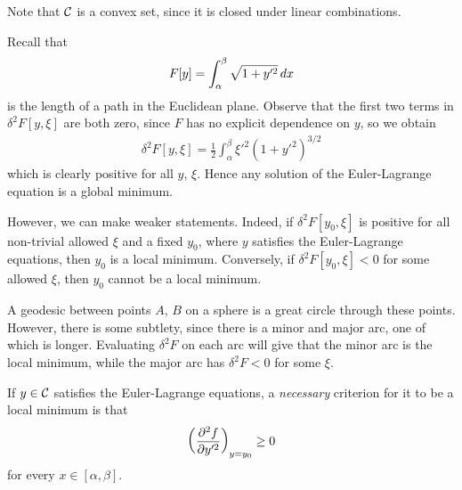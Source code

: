 \documentclass{../template/note}
\begin{document}
    \begin{remark*}
        Note that $\mathcal{C}$ is a convex set, since it is closed under linear combinations.
    \end{remark*}
    
    \begin{example*}
        Recall that
        \begin{align*}
            F[y] = \int_\alpha^\beta \sqrt{1 + y'^2} \,d{x}
        \end{align*}
        is the length of a path in the Euclidean plane. Observe that the first two terms in $\delta^2 F[y, \xi]$ are both zero, since $F$ has no explicit dependence on $y$, so we obtain
        \begin{align*}
            \delta^2 F[y, \xi] = \frac 1 2 \int_\alpha^\beta \xi'^2 \left(1 + y'^2\right)^{3/2}
        \end{align*}
        which is clearly positive for all $y$, $\xi$. Hence any solution of the Euler-Lagrange equation is a global minimum.
    \end{example*}
    
    However, we can make weaker statements. Indeed, if $\delta^2 F[y_0, \xi]$ is positive for all non-trivial allowed $\xi$ and a fixed $y_0$, where $y$ satisfies the Euler-Lagrange equations, then $y_0$ is a local minimum. Conversely, if $\delta^2 F[y_0, \xi] < 0$ for some allowed $\xi$, then $y_0$ cannot be a local minimum.
    
    \begin{example*}
        A geodesic between points $A$, $B$ on a sphere is a great circle through these points. However, there is some subtlety, since there is a minor and major arc, one of which is longer. Evaluating $\delta^2 F$ on each arc will give that the minor arc is the local minimum, while the major arc has $\delta^2 F < 0$ for some $\xi$.
    \end{example*}
    
    \begin{proposition}
        If $y \in \mathcal{C}$ satisfies the Euler-Lagrange equations, a \emph{necessary} criterion for it to be a local minimum is that
        \begin{align*}
            \left(\pd{^2f}{y'^2}\right)_{y=y_0} \geq 0
        \end{align*}
        for every $x \in [\alpha, \beta]$.        
    \end{proposition}
    
\end{document}
